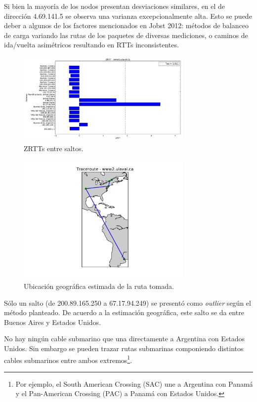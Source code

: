 \par Si bien la mayoría de los nodos presentan desviaciones similares, en el de dirección 4.69.141.5 se observa una varianza excepcionalmente alta.
Esto se puede deber a algunos de los factores mencionados en Jobst 2012\cite{anomalias}: métodos de balanceo de carga variando las rutas de los paquetes de diversas mediciones, o caminos de ida/vuelta asimétricos resultando en RTTs inconsistentes.

\begin{figure}[H]
    \centering
    \includegraphics[width=8.5cm]{img/grafico2-www2-ulaval-ca.pdf}
    \caption{\normalfont ZRTTs entre saltos.}
\end{figure}

\begin{figure}[H]
    \centering
    \includegraphics[width=8.5cm]{img/grafico3-www2-ulaval-ca.pdf}
    \caption{\normalfont Ubicación geográfica estimada de la ruta tomada.}
    \label{mapaLaval}
\end{figure}

\par Sólo un salto (de 200.89.165.250 a 67.17.94.249) se presentó como \textit{outlier} según el método planteado\cite{outliers}.
De acuerdo a la estimación geográfica, este salto se da entre Buenos Aires y Estados Unidos.

\par No hay ningún cable submarino que una directamente a Argentina con Estados Unidos.
Sin embargo se pueden trazar rutas submarinas componiendo distintos cables submarinos entre ambos extremos\footnote{Por ejemplo, el South American Crossing (SAC) une a Argentina con Panamá y el Pan-American Crossing (PAC) a Panamá con Estados Unidos.}.


